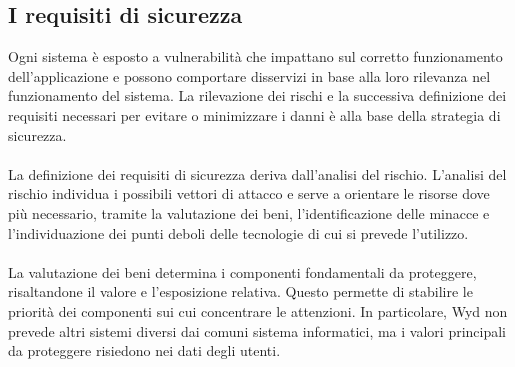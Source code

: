 \clearpage

\subsection{I requisiti di sicurezza}

Ogni sistema è esposto a vulnerabilità che impattano sul corretto funzionamento dell'applicazione
e possono comportare disservizi in base alla loro rilevanza nel funzionamento del sistema.
La rilevazione dei rischi e la successiva definizione dei requisiti necessari per evitare o minimizzare i danni
è alla base della strategia di sicurezza.\\
\\
La definizione dei requisiti di sicurezza deriva dall'analisi del rischio.
L'analisi del rischio individua i possibili vettori di attacco e serve a orientare le risorse dove più necessario,
tramite la valutazione dei beni, l'identificazione delle minacce e
l'individuazione dei punti deboli delle tecnologie di cui si prevede l'utilizzo.\\
\\
La valutazione dei beni determina i componenti fondamentali da proteggere,
risaltandone il valore e l'esposizione relativa.
Questo permette di stabilire le priorità dei componenti sui cui concentrare le attenzioni.
In particolare, Wyd non prevede altri sistemi diversi dai comuni sistema informatici,
ma i valori principali da proteggere risiedono nei dati degli utenti.\\
\\

